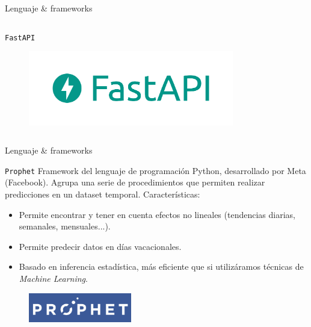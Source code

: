 \documentclass[aspectratio=169,xcolor=dvipsnames]{beamer}
\begin{document}
\begin{frame}{Lenguaje \& frameworks}
\begin{columns}
\begin{column}{0.5\textwidth}
\begin{exampleblock}{\texttt{FastAPI}}
					\begin{figure}[h!]
						\begin{center}
							\includegraphics[width=0.8\textwidth]{img/fastapi_logo.png}
						\end{center}
					\end{figure}
				\end{exampleblock}
				
				
			\end{column}
		\end{columns}
	\end{frame}

	\begin{frame}{Lenguaje \& frameworks}
		\begin{exampleblock}{\texttt{Prophet}}
			Framework del lenguaje de programación Python, desarrollado por Meta (Facebook). Agrupa una serie de procedimientos que permiten realizar predicciones en un dataset temporal. Características:
			
			\begin{itemize}
				\item Permite encontrar y tener en cuenta efectos no lineales (tendencias diarias, semanales, mensuales...).
				\item Permite predecir datos en días vacacionales.
				\item Basado en inferencia estadística, más eficiente que si utilizáramos técnicas de \textit{Machine Learning}.
			\end{itemize}
			
			\begin{figure}[h!]
				\begin{center}
					\includegraphics[width=0.4\textwidth]{img/prophet_logo.png}
				\end{center}
			\end{figure}
		\end{exampleblock}
	\end{frame}
	
\end{document}

